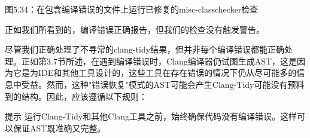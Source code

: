 \begin{center}
图5.34：在包含编译错误的文件上运行已修复的misc-classchecker检查
\end{center}

正如我们所看到的，编译错误正确报告，但我们的检查没有触发警告。

尽管我们正确处理了不寻常的clang-tidy结果，但并非每个编译错误都能正确处理。正如第3.7节所述，在遇到编译错误时，Clang编译器仍试图生成AST，这是因为它是为IDE和其他工具设计的，这些工具在存在错误的情况下仍从尽可能多的信息中受益。然而，这种"错误恢复"模式的AST可能会产生Clang-Tidy可能没有预料到的结构。因此，应该遵循以下规则：


\begin{myTip}{提示}
运行Clang-Tidy和其他Clang工具之前，始终确保代码没有编译错误。这样可以保证AST既准确又完整。
\end{myTip}

